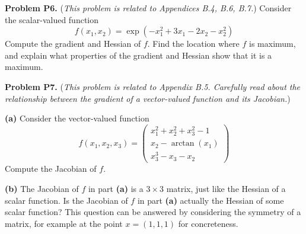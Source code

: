 \documentclass[12pt]{amsart}
\newcommand{\prob}[1]{\bigskip\noindent\textbf{#1}\quad }
\newcommand{\epart}[1]{\medskip\noindent\textbf{(#1)}\quad }
\begin{document}
\prob{Problem P6.}  (\emph{This problem is related to Appendices B.4, B.6, B.7.})  Consider the scalar-valued function
    $$f(x_1,x_2) = \exp(-x_1^2 + 3 x_1 - 2 x_2 - x_2^2)$$
Compute the gradient and Hessian of $f$.  Find the location where $f$ is maximum, and explain what properties of the gradient and Hessian show that it is a maximum.

\clearpage \newpage
\prob{Problem P7.}  (\emph{This problem is related to Appendix B.5.  Carefully read about the relationship between the gradient of a vector-valued function and its Jacobian.})

\epart{a}  Consider the vector-valued function
    $$f(x_1,x_2,x_3) = \begin{pmatrix}  x_1^2 + x_2^2 + x_3^2 - 1 \\
                                        x_2 - \arctan(x_1) \\
                                        x_3^3 - x_3 - x_2 \end{pmatrix}$$
Compute the Jacobian of $f$.

\epart{b}  The Jacobian of $f$ in part \textbf{(a)} is a $3 \times 3$ matrix, just like the Hessian of a scalar function.  Is the Jacobian of $f$ in part \textbf{(a)} actually the Hessian of some scalar function?  This question can be answered by considering the symmetry of a matrix, for example at the point $x=(1,1,1)$ for concreteness.
\end{document}
